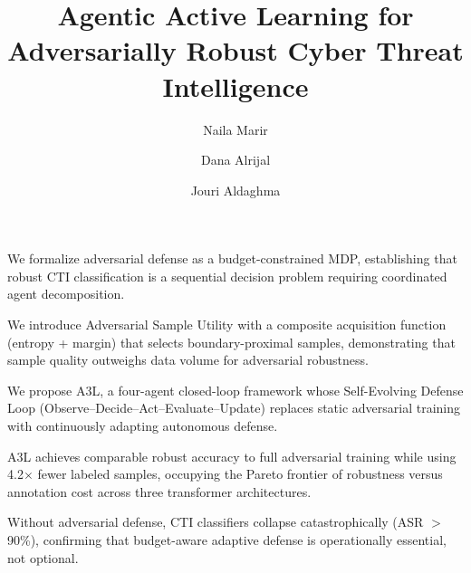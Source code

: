 \documentclass[review,1p,times,number]{elsarticle}
\begin{document}
\begin{frontmatter}

\title{Agentic Active Learning for Adversarially Robust Cyber Threat Intelligence}

\author[effat]{Naila Marir}

\author[effat]{Dana Alrijal}
\author[effat]{Jouri Aldaghma}



\begin{highlights}
\item We formalize adversarial defense as a budget-constrained MDP,
  establishing that robust CTI classification is a sequential
  decision problem requiring coordinated agent decomposition.

\item We introduce Adversarial Sample Utility with a composite
  acquisition function (entropy + margin) that selects
  boundary-proximal samples, demonstrating that sample quality
  outweighs data volume for adversarial robustness.

\item We propose A3L, a four-agent closed-loop framework whose
  Self-Evolving Defense Loop (Observe--Decide--Act--Evaluate--Update)
  replaces static adversarial training with continuously adapting
  autonomous defense.

\item A3L achieves comparable robust accuracy to full adversarial
  training while using 4.2$\times$ fewer labeled samples, occupying
  the Pareto frontier of robustness versus annotation cost across
  three transformer architectures.

\item Without adversarial defense, CTI classifiers collapse
  catastrophically (ASR $>$ 90\%), confirming that budget-aware
  adaptive defense is operationally essential, not optional.
\end{highlights}


\end{frontmatter}
\end{document}
